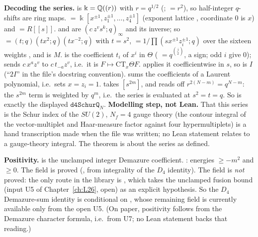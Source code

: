 \begin{dictionary}
\textbf{Decoding the series.}  is $\Bbbk={\mathbb{Q}}((r))$ with $r=q^{1/2}$ (;  $=r^2$), so
half-integer $q$-shifts are ring maps.  $=\Bbbk[x^{\pm1},z_1^{\pm1},\dots,z_4^{\pm1}]$ (exponent lattice
, coordinate $0$ is $x$) and  $=R[[s]]$.  and  are
$(c\,z^vs^k;q)_\infty$ and its inverse; so  $=(t;q)(tx^2;q)(tx^{-2};q)$ with $t=s^2$, 
$=1/\prod(sx^{\pm1}z_i^{\pm1};q)$ over the sixteen weights , and  is $M$.
 is the coefficient $t_i$ of $x^i$ in $\Theta$ ( $=q^{\binom j2}$,  a sign; odd
$i$ give $0$);  sends $c\,x^az^v$ to $c\,t_{-a}z^v$, i.e.\ it is $F\mapsto\mathrm{CT}_x\Theta F$.
 applies it coefficientwise in $s$, so  is $I$ (``$2I$'' in the file's docstring
convention).  sums the coefficients of a Laurent polynomial, i.e.\ sets $x=z_i=1$. 
takes $[s^{2m}]$, and  reads off $r^{2(N-m)}=q^{N-m}$: the $s^{2m}$ term is weighted by
$q^m$, i.e.\ the series is evaluated at $s^2=t=q$. So  is exactly the displayed
$\mathtt{d4SchurQ}_N$. \textbf{Modelling step, not Lean.} That this series is the Schur index of the $SU(2)$,
$N_f=4$ gauge theory (the contour integral of the vector-multiplet and Haar-measure factor against four
hypermultiplets) is a hand transcription made when the file was written; no Lean statement relates
 to a gauge-theory integral. The theorem is about the series as defined.

\textbf{Positivity.}  is the unclamped integer Demazure coefficient. :
energies $\ge-m^2$ and $\ge0$. The  field is proved (, from
integrality of the $D_4$ identity). The  field is \emph{not} proved: the only route in the library is
, which takes the unclamped fusion bound  (input U5 of
Chapter~\ref{ch:L26}, open) as an explicit hypothesis. So the $D_4$ Demazure-sum identity is conditional on
, whose remaining field is currently available only from the open U5. (On paper, positivity
follows from the Demazure character formula, i.e.\ from U7; no Lean statement backs that reading.)
\end{dictionary}
